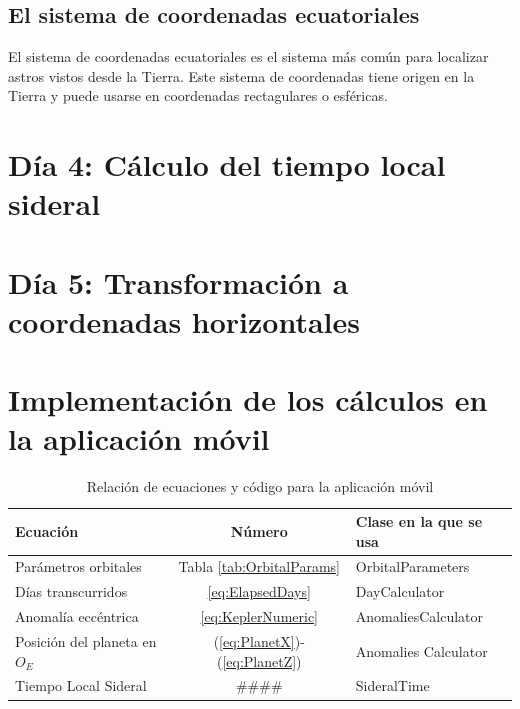 \documentclass[a4paper,10pt]{article}
\begin{document}
\subsection{El sistema de coordenadas ecuatoriales}
El sistema de coordenadas ecuatoriales es el sistema más común para localizar astros vistos desde la Tierra. Este sistema de coordenadas tiene origen en la Tierra y puede usarse en coordenadas rectagulares o esféricas. 

\section{Día 4: Cálculo del tiempo local sideral}

\section{Día 5: Transformación a coordenadas horizontales}

\section{Implementación de los cálculos en la aplicación móvil}
\begin{table}[!h]
  \centering
  \begin{tabular}{lcl}
    Ecuación & Número & Clase en la que se usa\\
    \hline
    Parámetros orbitales & Tabla \ref{tab:OrbitalParams} & OrbitalParameters\\
    Días transcurridos & \ref{eq:ElapsedDays} & DayCalculator\\
    Anomalía eccéntrica & \ref{eq:KeplerNumeric} & AnomaliesCalculator\\
    Posición del planeta en $O_E$ & (\ref{eq:PlanetX})-(\ref{eq:PlanetZ}) & Anomalies Calculator\\
    Tiempo Local Sideral & \#\#\#\# & SideralTime\\
    \hline
  \end{tabular}
  \caption{Relación de ecuaciones y código para la aplicación móvil}
  \label{tab:EqsAndCode}
\end{table}
\end{document}
